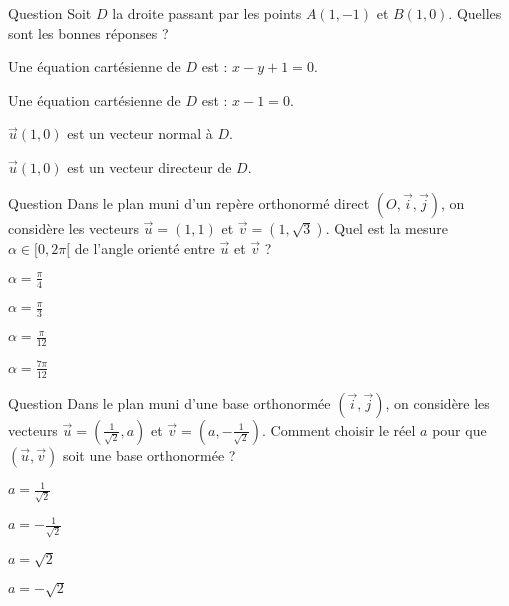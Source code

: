 \begin{multi}[multiple,feedback=
{Les coordonnées de \(A\) et \(B\) vérifient l'équation \(x-1=0\), celle-ci est donc une équation cartésienne de \(D\) et \(\vec{u}(1,0)\) est un vecteur normal à \(D\).
}]{Question}
Soit \(D\) la droite passant par les points \(A(1,-1)\) et \(B(1,0)\). Quelles sont les bonnes réponses ?

    \item Une équation cartésienne de \(D\) est : \(x-y+1=0\).
    \item* Une équation cartésienne de \(D\) est : \(x-1=0\).
    \item* \(\vec{u}(1,0)\) est un vecteur normal à \(D\).
    \item \(\vec{u}(1,0)\) est un vecteur directeur de \(D\).
\end{multi}


\begin{multi}[multiple,feedback=
{Une mesure de l'angle orienté entre \(\vec{i}\) et \(\vec{u}\) est \(\displaystyle a=\frac{\pi}{4}\) et une mesure de l'angle orienté entre \(\vec{i}\) et \(\vec{v}\) est \(\displaystyle b=\frac{\pi}{3}\). Donc \(\displaystyle \alpha =b-a=\frac{\pi}{12}\).
}]{Question}
Dans le plan muni d'un repère orthonormé direct \((O,\vec{i},\vec{j})\), on considère les vecteurs \(\displaystyle \vec{u}=\left(1,1\right)\) et \(\displaystyle \vec{v}=\left(1,\sqrt{3}\right)\). Quel est la mesure \(\alpha \in [0,2\pi[\) de l'angle orienté entre \(\vec{u}\) et \(\vec{v}\) ?

    \item \(\displaystyle \alpha =\frac{\pi}{4}\)
    \item \(\displaystyle \alpha =\frac{\pi}{3}\)
    \item* \(\displaystyle \alpha =\frac{\pi}{12}\)
    \item \(\displaystyle \alpha =\frac{7\pi}{12}\)
\end{multi}


\begin{multi}[multiple,feedback=
{Pour tout \(a\in \Rr\), les vecteurs \(\vec{u}\) et \(\vec{v}\) sont orthogonaux. Ensuite, \(\|\vec{u}\|=\|\vec{v}\|=1\) implique \(\displaystyle a=\frac{\pm 1}{\sqrt{2}}\).
}]{Question}
Dans le plan muni d'une base orthonormée \((\vec{i},\vec{j})\), on considère les vecteurs \(\displaystyle \vec{u}=\left(\frac{1}{\sqrt{2}},a\right)\) et \(\displaystyle \vec{v}=\left(a,-\frac{1}{\sqrt{2}}\right)\). Comment choisir le réel \(a\) pour que \((\vec{u},\vec{v})\) soit une base orthonormée ?

    \item* \(\displaystyle a=\frac{1}{\sqrt{2}}\)
    \item* \(\displaystyle a=-\frac{1}{\sqrt{2}}\)
    \item \(\displaystyle a=\sqrt{2}\)
    \item \(\displaystyle a=-\sqrt{2}\)
\end{multi}


